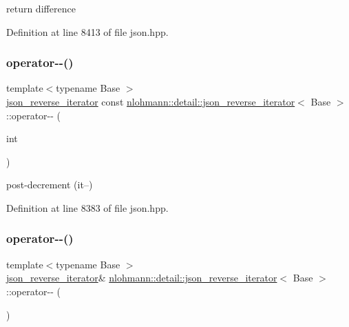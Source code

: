 return difference 



Definition at line 8413 of file json.\+hpp.

\mbox{\label{classnlohmann_1_1detail_1_1json__reverse__iterator_a2c170f51371538da2c8f4094305da3d3}} 
\subsubsection{\texorpdfstring{operator-\/-\/()}{operator--()}\hspace{0.1cm}{\footnotesize\ttfamily [1/2]}}
{\footnotesize\ttfamily template$<$typename Base $>$ \\
\mbox{\hyperlink{classnlohmann_1_1detail_1_1json__reverse__iterator}{json\+\_\+reverse\+\_\+iterator}} const \mbox{\hyperlink{classnlohmann_1_1detail_1_1json__reverse__iterator}{nlohmann\+::detail\+::json\+\_\+reverse\+\_\+iterator}}$<$ Base $>$\+::operator-\/-\/ (\begin{DoxyParamCaption}\item[{int}]{ }\end{DoxyParamCaption})\hspace{0.3cm}{\ttfamily [inline]}}



post-\/decrement (it--) 



Definition at line 8383 of file json.\+hpp.

\mbox{\label{classnlohmann_1_1detail_1_1json__reverse__iterator_a2488d6a902103610943920ac49d12a04}} 
\subsubsection{\texorpdfstring{operator-\/-\/()}{operator--()}\hspace{0.1cm}{\footnotesize\ttfamily [2/2]}}
{\footnotesize\ttfamily template$<$typename Base $>$ \\
\mbox{\hyperlink{classnlohmann_1_1detail_1_1json__reverse__iterator}{json\+\_\+reverse\+\_\+iterator}}\& \mbox{\hyperlink{classnlohmann_1_1detail_1_1json__reverse__iterator}{nlohmann\+::detail\+::json\+\_\+reverse\+\_\+iterator}}$<$ Base $>$\+::operator-\/-\/ (\begin{DoxyParamCaption}{ }\end{DoxyParamCaption})\hspace{0.3cm}{\ttfamily [inline]}}



